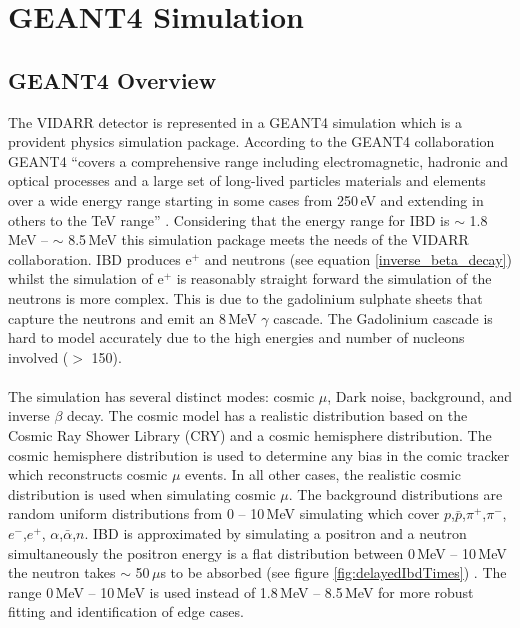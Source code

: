 

\chapter{GEANT4 Simulation}\label{chp:GEANT4Simulation}
\ifpdf
    \graphicspath{{Chapter4/Figs/Raster/}{Chapter4/Figs/PDF/}{Chapter4/Figs/}}
\else
    \graphicspath{{Chapter4/Figs/Vector/}{Chapter4/Figs/}}
\fi

\section{GEANT4 Overview}\label{sec:GEANT4Simulation_g4Overview}
The VIDARR detector is represented in a GEANT4 simulation which is a provident physics simulation package. According to the GEANT4 collaboration GEANT4 ``covers a comprehensive range including electromagnetic, hadronic and optical processes and a large set of long-lived particles materials and elements over a wide energy range starting in some cases from 250\,eV and extending in others to the TeV range'' \cite{Agostinelli:2002hh}. Considering that the energy range for IBD is $\sim$ 1.8\,MeV -- $\sim$ 8.5\,MeV \cite{Mueller_2011} this simulation package meets the needs of the VIDARR collaboration. IBD produces e$^+$ and neutrons (see equation \ref{inverse_beta_decay}) whilst the simulation of e$^+$ is reasonably straight forward the simulation of the neutrons is more complex. This is due to the gadolinium sulphate sheets that capture the neutrons and emit an 8\,MeV $\gamma$ cascade. The Gadolinium cascade is hard to model accurately due to the high energies and number of nucleons involved ($>$ 150).
\\\\The simulation has several distinct modes: cosmic $\mu$, Dark noise, background, and inverse $\beta$ decay. The cosmic model has a realistic distribution based on the Cosmic Ray Shower Library (CRY) \cite{ieee_cry_2007} and a cosmic hemisphere distribution. The cosmic hemisphere distribution is used to determine any bias in the comic tracker which reconstructs cosmic $\mu$ events. In all other cases, the realistic cosmic distribution is used when simulating cosmic $\mu$. The background distributions are random uniform distributions from 0 -- 10\,MeV simulating which cover $p$,$\bar{p}$,$\pi^+$,$\pi^-$,$e^-$,$e^+$, $\alpha$,$\bar{\alpha}$,$n$. IBD is approximated by simulating a positron and a neutron simultaneously the positron energy is a flat distribution between 0\,MeV -- 10\,MeV the neutron takes $\sim$ 50\,$\mu$s to be absorbed (see figure \ref{fig:delayedIbdTimes}) . The range 0\,MeV -- 10\,MeV is used instead of 1.8\,MeV -- 8.5\,MeV for more robust fitting and identification of edge cases.
